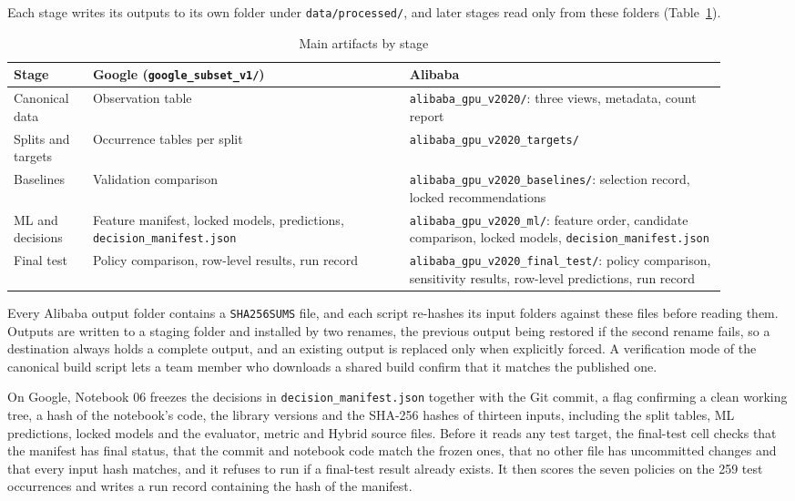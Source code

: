 \documentclass{IEEEtran}
\begin{document}
Each stage writes its outputs to its own folder under \texttt{data/processed/}, and later stages read only from these folders (Table~\ref{tab:5.7}).

\begin{table}[!t]
\centering
\footnotesize
\caption{Main artifacts by stage}\label{tab:5.7}
\begin{tabular}{>{\raggedright\arraybackslash}p{0.107\linewidth}>{\raggedright\arraybackslash}p{0.402\linewidth}>{\raggedright\arraybackslash}p{0.402\linewidth}}
\hline
\textbf{Stage} & \textbf{Google (\texttt{google\_subset\_v1/})} & \textbf{Alibaba} \\ \hline
Canonical data & Observation table & \texttt{alibaba\_gpu\_v2020/}: three views, metadata, count report \\
Splits and targets & Occurrence tables per split & \texttt{alibaba\_gpu\_v2020\_targets/} \\
Baselines & Validation comparison & \texttt{alibaba\_gpu\_v2020\_baselines/}: selection record, locked recommendations \\
ML and decisions & Feature manifest, locked models, predictions, \texttt{decision\_manifest.json} & \texttt{alibaba\_gpu\_v2020\_ml/}: feature order, candidate comparison, locked models, \texttt{decision\_manifest.json} \\
Final test & Policy comparison, row-level results, run record & \texttt{alibaba\_gpu\_v2020\_final\_test/}: policy comparison, sensitivity results, row-level predictions, run record \\
\hline
\end{tabular}
\end{table}

Every Alibaba output folder contains a \texttt{SHA256SUMS} file, and each script re-hashes its input folders against these files before reading them. Outputs are written to a staging folder and installed by two renames, the previous output being restored if the second rename fails, so a destination always holds a complete output, and an existing output is replaced only when explicitly forced. A verification mode of the canonical build script lets a team member who downloads a shared build confirm that it matches the published one.

On Google, Notebook 06 freezes the decisions in \texttt{decision\_manifest.json} together with the Git commit, a flag confirming a clean working tree, a hash of the notebook's code, the library versions and the SHA-256 hashes of thirteen inputs, including the split tables, ML predictions, locked models and the evaluator, metric and Hybrid source files. Before it reads any test target, the final-test cell checks that the manifest has final status, that the commit and notebook code match the frozen ones, that no other file has uncommitted changes and that every input hash matches, and it refuses to run if a final-test result already exists. It then scores the seven policies on the 259 test occurrences and writes a run record containing the hash of the manifest.
\end{document}
